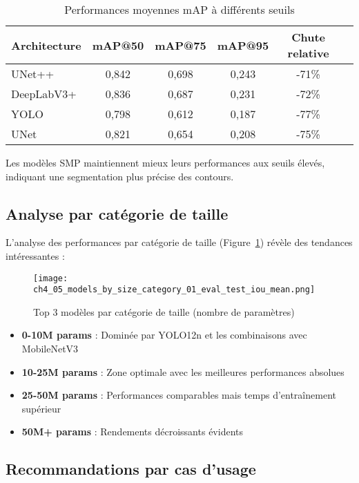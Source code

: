 \begin{table}[htbp]
    \centering
    \caption{Performances moyennes mAP à différents seuils}
    \begin{tabular}{lccccc}
        \toprule
        Architecture & mAP@50 & mAP@75 & mAP@95 & Chute relative \\
        \midrule
        UNet++ & 0,842 & 0,698 & 0,243 & -71\% \\
        DeepLabV3+ & 0,836 & 0,687 & 0,231 & -72\% \\
        YOLO & 0,798 & 0,612 & 0,187 & -77\% \\
        UNet & 0,821 & 0,654 & 0,208 & -75\% \\
        \bottomrule
    \end{tabular}
    \label{tab:map_analysis}
\end{table}

Les modèles SMP maintiennent mieux leurs performances aux seuils élevés, indiquant une segmentation plus précise des contours.

\subsection{Analyse par catégorie de taille}

L'analyse des performances par catégorie de taille (Figure~\ref{fig:models_by_size}) révèle des tendances intéressantes :

\begin{figure}[htbp]
    \centering
    \texttt{[image: ch4\_05\_models\_by\_size\_category\_01\_eval\_test\_iou\_mean.png]}
    \caption{Top 3 modèles par catégorie de taille (nombre de paramètres)}
    \label{fig:models_by_size}
\end{figure}

\begin{itemize}
    \item \textbf{0-10M params} : Dominée par YOLO12n et les combinaisons avec MobileNetV3
    \item \textbf{10-25M params} : Zone optimale avec les meilleures performances absolues
    \item \textbf{25-50M params} : Performances comparables mais temps d'entraînement supérieur
    \item \textbf{50M+ params} : Rendements décroissants évidents
\end{itemize}

\subsection{Recommandations par cas d'usage}

